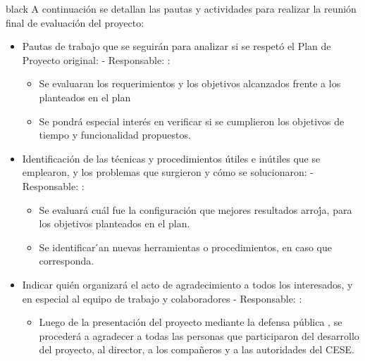 \documentclass[
11pt, %
codirector, %
]{charter}
\begin{document}
\begin{consigna}{black}
A continuación se detallan las pautas y actividades para realizar la reunión final de evaluación del proyecto:

\begin{itemize}
	\item Pautas de trabajo que se seguirán para analizar si se respetó el Plan de Proyecto original:
	 - Responsable: \authorname:
	\begin{itemize}			
		\item Se evaluaran los requerimientos y los objetivos alcanzados frente a los planteados en el plan
		\item Se pondrá especial interés en verificar si se cumplieron los objetivos de tiempo y funcionalidad propuestos.
	\end{itemize}	    	 
	
	\item Identificación de las técnicas y procedimientos útiles e inútiles que se emplearon, y los problemas que surgieron y cómo se solucionaron:
	 - Responsable: \authorname:
	\begin{itemize}			
		\item Se evaluará cuál fue la configuración que mejores resultados arroj́a, para los objetivos planteados en el plan.
		\item Se identificar ́an nuevas herramientas o procedimientos, en caso que corresponda.
	\end{itemize}	    	 
	
	\item Indicar quién organizará el acto de agradecimiento a todos los interesados, y en especial al equipo de trabajo y colaboradores - Responsable: \authorname :
	\begin{itemize}			
		\item Luego de la presentación del proyecto mediante la defensa pública , se procederá a agradecer a todas las personas que participaron del desarrollo del proyecto, al director, a los compañeros y a las autoridades del CESE.
	\end{itemize}	 
	
	    	 
	 
\end{itemize}

\end{consigna}
\end{document}
